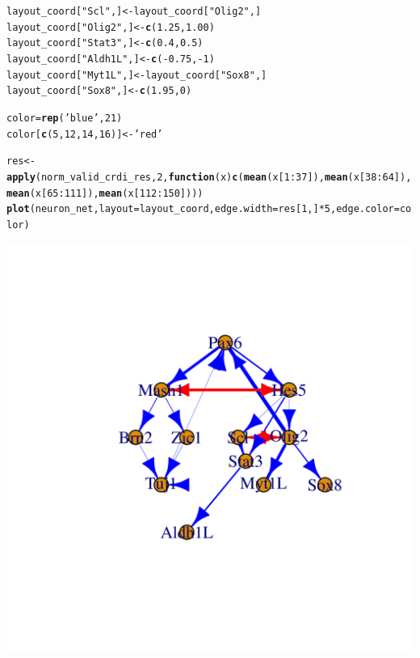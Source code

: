 \documentclass[10pt,oneside]{article}\usepackage[]{graphicx}\usepackage[]{color}
\makeatletter
\def\maxwidth{ %
  \ifdim\Gin@nat@width>\linewidth
    \linewidth
  \else
    \Gin@nat@width
  \fi
}
\newcommand{\hlnum}[1]{\textcolor[rgb]{0.686,0.059,0.569}{#1}}%
\newcommand{\hlstr}[1]{\textcolor[rgb]{0.192,0.494,0.8}{#1}}%
\newcommand{\hlopt}[1]{\textcolor[rgb]{0,0,0}{#1}}%
\newcommand{\hlstd}[1]{\textcolor[rgb]{0.345,0.345,0.345}{#1}}%
\newcommand{\hlkwa}[1]{\textcolor[rgb]{0.161,0.373,0.58}{\textbf{#1}}}%
\newcommand{\hlkwb}[1]{\textcolor[rgb]{0.69,0.353,0.396}{#1}}%
\newcommand{\hlkwc}[1]{\textcolor[rgb]{0.333,0.667,0.333}{#1}}%
\newcommand{\hlkwd}[1]{\textcolor[rgb]{0.737,0.353,0.396}{\textbf{#1}}}%
\newenvironment{kframe}{%
 \def\at@end@of@kframe{}%
 \ifinner\ifhmode%
  \def\at@end@of@kframe{\end{minipage}}%
  \begin{minipage}{\columnwidth}%
 \fi\fi%
 \def\FrameCommand##1{\hskip\@totalleftmargin \hskip-\fboxsep
 \colorbox{shadecolor}{##1}\hskip-\fboxsep
     \hskip-\linewidth \hskip-\@totalleftmargin \hskip\columnwidth}%
 \MakeFramed {\advance\hsize-\width
   \@totalleftmargin\z@ \linewidth\hsize
   \@setminipage}}%
 {\par\unskip\endMakeFramed%
 \at@end@of@kframe}
\newenvironment{knitrout}{}{} %
\makeatother
\begin{document}
\begin{knitrout}
\begin{kframe}
\begin{alltt}
\hlstd{layout_coord[}\hlstr{"Scl"}\hlstd{, ]} \hlkwb{<-} \hlstd{layout_coord[}\hlstr{"Olig2"}\hlstd{, ]}
\hlstd{layout_coord[}\hlstr{"Olig2"}\hlstd{, ]} \hlkwb{<-} \hlkwd{c}\hlstd{(}\hlnum{1.25}\hlstd{,} \hlnum{1.00}\hlstd{)}
\hlstd{layout_coord[}\hlstr{"Stat3"}\hlstd{, ]} \hlkwb{<-} \hlkwd{c}\hlstd{(}\hlnum{0.4}\hlstd{,} \hlnum{0.5}\hlstd{)}
\hlstd{layout_coord[}\hlstr{"Aldh1L"}\hlstd{, ]} \hlkwb{<-} \hlkwd{c}\hlstd{(}\hlopt{-}\hlnum{0.75}\hlstd{,} \hlopt{-}\hlnum{1}\hlstd{)}
\hlstd{layout_coord[}\hlstr{"Myt1L"}\hlstd{, ]} \hlkwb{<-} \hlstd{layout_coord[}\hlstr{"Sox8"}\hlstd{, ]}
\hlstd{layout_coord[}\hlstr{"Sox8"}\hlstd{, ]} \hlkwb{<-} \hlkwd{c}\hlstd{(}\hlnum{1.95}\hlstd{,} \hlnum{0}\hlstd{)}

\hlstd{color} \hlkwb{=} \hlkwd{rep}\hlstd{(}\hlstr{'blue'}\hlstd{,} \hlnum{21}\hlstd{)}
\hlstd{color[}\hlkwd{c}\hlstd{(}\hlnum{5}\hlstd{,} \hlnum{12}\hlstd{,} \hlnum{14}\hlstd{,} \hlnum{16}\hlstd{)]} \hlkwb{<-} \hlstr{'red'}

\hlstd{res} \hlkwb{<-} \hlkwd{apply}\hlstd{(norm_valid_crdi_res,} \hlnum{2}\hlstd{,} \hlkwa{function}\hlstd{(}\hlkwc{x}\hlstd{)} \hlkwd{c}\hlstd{(}\hlkwd{mean}\hlstd{(x[}\hlnum{1}\hlopt{:}\hlnum{37}\hlstd{]),} \hlkwd{mean}\hlstd{(x[}\hlnum{38}\hlopt{:}\hlnum{64}\hlstd{]),} \hlkwd{mean}\hlstd{(x[}\hlnum{65}\hlopt{:}\hlnum{111}\hlstd{]),} \hlkwd{mean}\hlstd{(x[}\hlnum{112}\hlopt{:}\hlnum{150}\hlstd{])))}
\hlkwd{plot}\hlstd{(neuron_net,} \hlkwc{layout} \hlstd{= layout_coord,} \hlkwc{edge.width}\hlstd{=res[}\hlnum{1}\hlstd{, ]} \hlopt{*} \hlnum{5}\hlstd{,} \hlkwc{edge.color} \hlstd{= color)}
\end{alltt}
\end{kframe}

{\centering \includegraphics[width=\maxwidth]{figure/plot_temporal_rdi-5} 

}
\end{knitrout}
\end{document}

